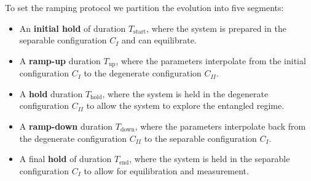 \documentclass{subfiles}
\begin{document}
To set the ramping protocol we partition the evolution into five segments:
\begin{itemize}
    \item An \textbf{initial hold} of duration $T_{\text{start}}$, where the system is prepared in the separable configuration $C_I$ and can equilibrate.
    \item A \textbf{ramp-up} duration $T_{\text{up}}$, where the parameters interpolate from the initial configuration $C_I$ to the degenerate configuration $C_{II}$.
    \item A \textbf{hold} duration $T_{\text{hold}}$, where the system is held in the degenerate configuration $C_{II}$ to allow the system to explore the entangled regime.
    \item A \textbf{ramp-down} duration $T_{\text{down}}$, where the parameters interpolate back from the degenerate configuration $C_{II}$ to the separable configuration $C_I$.
    \item A final \textbf{hold} of duration $T_{\text{end}}$, where the system is held in the separable configuration $C_I$ to allow for equilibration and measurement.
\end{itemize}
\end{document}
